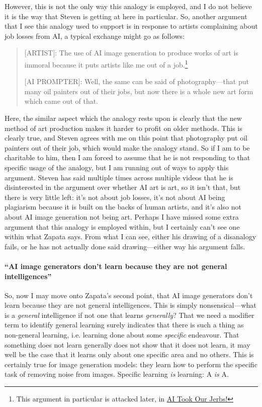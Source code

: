 \documentclass[11pt]{article}
\begin{document}
However, this is not the only way this analogy is employed, and I do not believe it is the way that Steven is getting at here in particular. So, another argument that I see this analogy used to support is in response to artists complaining about job losses from AI, a typical exchange might go as follows:

\begin{quote}
[ARTIST]: The use of AI image generation to produce works of art is immoral because it puts artists like me out of a job.\footnote{This argument in particular is attacked later, in \hyperref[sec:orga295b8e]{AI Took Our Jerbs!}}

[AI PROMPTER]: Well, the same can be said of photography---that put many oil painters out of their jobs, but now there is a whole new art form which came out of that.
\end{quote}

Here, the similar aspect which the analogy rests upon is clearly that the new method of art production makes it harder to profit on older methods. This is clearly true, and Steven agrees with me on this point that photography put oil painters out of their job, which would make the analogy stand. So if I am to be charitable to him, then I am forced to assume that he is not responding to that specific usage of the analogy, but I am running out of ways to apply this argument. Steven has said multiple times across multiple videos that he is disinterested in the argument over whether AI art is art, so it isn't that, but there is very little left: it's not about job losses, it's not about AI being plagiarism because it is built on the backs of human artists, and it's also not about AI image generation not being art. Perhaps I have missed some extra argument that this analogy is employed within, but I certainly can't see one within what Zapata says. From what I can see, either his drawing of a disanalogy fails, or he has not actually done said drawing---either way his argument falls.

\paragraph*{``AI image generators don't learn because they are not general intelligences''}
\label{sec:org9d1f624}
So, now I may move onto Zapata's second point, that AI image generators don't learn because they are not general intelligences. This is simply nonsensical---what is a \emph{general} intelligence if not one that learns \emph{generally}? That we need a modifier term to identify general learning surely indicates that there is such a thing as non-general learning, i.e. learning done about some \emph{specific} endeavour. That something does not learn generally does not show that it does not learn, it may well be the case that it learns only about one specific area and no others. This is certainly true for image generation models: they learn how to perform the specific task of removing noise from images. Specific learning \emph{is} learning: A \emph{is} A.
\end{document}
